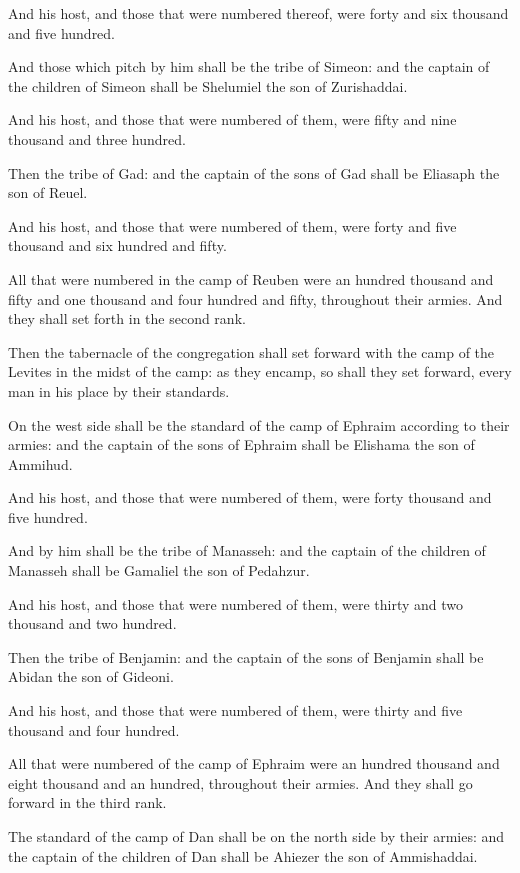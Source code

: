 \verse And his host, and those that were numbered thereof, were forty
and six thousand and five hundred.

\verse And those which pitch by him shall be the tribe of Simeon: and
the captain of the children of Simeon shall be Shelumiel the son of
Zurishaddai.

\verse And his host, and those that were numbered of them, were fifty
and nine thousand and three hundred.

\verse Then the tribe of Gad: and the captain of the sons of Gad shall
be Eliasaph the son of Reuel.

\verse And his host, and those that were numbered of them, were forty
and five thousand and six hundred and fifty.

\verse All that were numbered in the camp of Reuben were an hundred
thousand and fifty and one thousand and four hundred and fifty,
throughout their armies. And they shall set forth in the second rank.

\verse Then the tabernacle of the congregation shall set forward with
the camp of the Levites in the midst of the camp: as they encamp, so
shall they set forward, every man in his place by their standards.

\verse On the west side shall be the standard of the camp of Ephraim
according to their armies: and the captain of the sons of Ephraim
shall be Elishama the son of Ammihud.

\verse And his host, and those that were numbered of them, were forty
thousand and five hundred.

\verse And by him shall be the tribe of Manasseh: and the captain of the
children of Manasseh shall be Gamaliel the son of Pedahzur.

\verse And his host, and those that were numbered of them, were thirty
and two thousand and two hundred.

\verse Then the tribe of Benjamin: and the captain of the sons of
Benjamin shall be Abidan the son of Gideoni.

\verse And his host, and those that were numbered of them, were thirty
and five thousand and four hundred.

\verse All that were numbered of the camp of Ephraim were an hundred
thousand and eight thousand and an hundred, throughout their armies.
And they shall go forward in the third rank.

\verse The standard of the camp of Dan shall be on the north side by
their armies: and the captain of the children of Dan shall be Ahiezer
the son of Ammishaddai.

